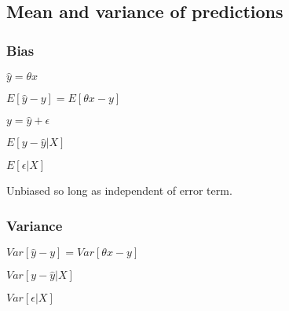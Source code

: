 
\subsection{Mean and variance of predictions}

\subsubsection{Bias}

\(\hat y =\theta x\)

\(E[\hat y-y]=E[\theta x-y]\) 

\(y=\hat y + \epsilon \)

\(E[y-\hat y |X]\)

\(E[\epsilon |X]\)

Unbiased so long as independent of error term.

\subsubsection{Variance}

\(Var [\hat y-y]=Var [\theta x-y]\)

\(Var[y-\hat y |X]\)

\(Var[\epsilon |X]\)

